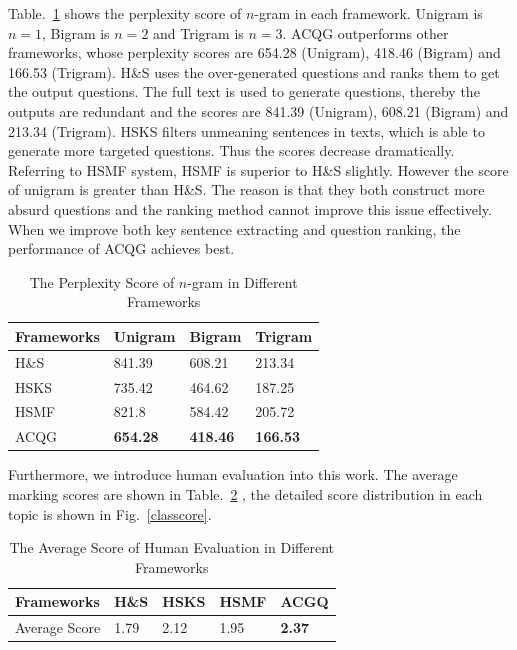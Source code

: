 \documentclass[runningheads,UTF8,article]{comsis2}
\begin{document}
	
	Table.~\ref{perplexity} shows the perplexity score of $ n $-gram in each framework. Unigram is $n=1$, Bigram is $ n=2$ and Trigram is $n=3$. ACQG outperforms other frameworks, whose perplexity scores are 654.28 (Unigram), 418.46 (Bigram) and 166.53 (Trigram). H\&S uses the over-generated questions and ranks them to get the output questions. The full text is used to generate questions, thereby the outputs are redundant and the scores are 841.39 (Unigram), 608.21 (Bigram) and 213.34 (Trigram). HSKS filters unmeaning sentences in texts, which is able to generate more targeted questions. Thus the scores decrease dramatically. Referring to HSMF system, HSMF is superior to H\&S slightly. However the score of unigram is greater than H\&S. The reason is that they both construct more absurd questions and the ranking method cannot improve this issue effectively. When we improve both key sentence extracting and question ranking, the performance of ACQG achieves best.
	\begin{table}[!ht]
		\centering
		\caption{The Perplexity Score of $n$-gram in Different Frameworks}
		\label{perplexity}
		\setlength\tabcolsep{0.5em}
		\begin{tabular}{|p{50pt}|p{50pt}p{50pt}p{50pt}|}
			\hline
			Frameworks& Unigram & Bigram & Trigram \\
			\hline
			H\&S & 841.39 & 608.21 & 213.34\\
			HSKS & 735.42 & 464.62 & 187.25 \\
			HSMF& 821.8 & 584.42 & 205.72 \\
			ACQG & \textbf{654.28} & \textbf{418.46} & \textbf{166.53} \\
			\hline
		\end{tabular}
	\end{table}
	
	
	Furthermore, we introduce human evaluation into this work. The average marking scores are shown in Table.~\ref{averagescre} , the detailed score distribution in each topic is shown in Fig.~\ref{classcore}. 
	
	
	\begin{table}[!ht]
		\centering
		\caption{The Average Score of Human Evaluation in Different Frameworks}
		\label{averagescre}
		\setlength\tabcolsep{0.5em}
		\begin{tabular}{|p{80pt}|p{40pt}p{40pt}p{40pt}p{40pt}|}
			\hline
			Frameworks  & H\&S & HSKS & HSMF & ACGQ \\
			\hline
			Average Score & 1.79 & 2.12 & 1.95 &\textbf{2.37}\\
			\hline
		\end{tabular}
	\end{table}
	
\end{document}

